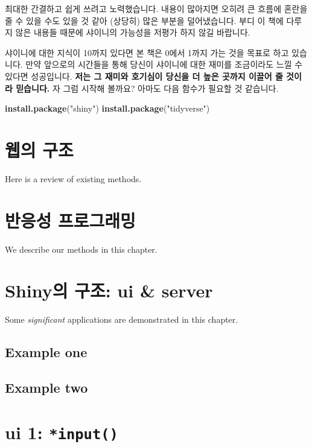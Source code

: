\documentclass[]{book}
\newenvironment{Shaded}{\begin{snugshade}}{\end{snugshade}}
\newcommand{\KeywordTok}[1]{\textcolor[rgb]{0.13,0.29,0.53}{\textbf{#1}}}
\newcommand{\StringTok}[1]{\textcolor[rgb]{0.31,0.60,0.02}{#1}}
\newcommand{\NormalTok}[1]{#1}
\begin{document}
최대한 간결하고 쉽게 쓰려고 노력했습니다. 내용이 많아지면 오히려 큰
흐름에 혼란을 줄 수 있을 수도 있을 것 같아 (상당히) 많은 부분을
덜어냈습니다. 부디 이 책에 다루지 않은 내용들 때문에 샤이니의 가능성을
저평가 하지 않길 바랍니다.

샤이니에 대한 지식이 10까지 있다면 본 책은 0에서 1까지 가는 것을 목표로
하고 있습니다. 만약 앞으로의 시간들을 통해 당신이 샤이니에 대한 재미를
조금이라도 느낄 수 있다면 성공입니다. \textbf{저는 그 재미와 호기심이
당신을 더 높은 곳까지 이끌어 줄 것이라 믿습니다.} 자 그럼 시작해 볼까요?
아마도 다음 함수가 필요할 것 같습니다.

\begin{Shaded}
\begin{Highlighting}[]
\KeywordTok{install.package}\NormalTok{(}\StringTok{"shiny"}\NormalTok{)}
\KeywordTok{install.package}\NormalTok{(}\StringTok{"tidyverse"}\NormalTok{)}
\end{Highlighting}
\end{Shaded}

\chapter{웹의 구조}\label{web}

Here is a review of existing methods.

\chapter{반응성 프로그래밍}\label{reactive}

We describe our methods in this chapter.

\chapter{Shiny의 구조: ui \& server}\label{structure}

Some \emph{significant} applications are demonstrated in this chapter.

\section{Example one}\label{example-one}

\section{Example two}\label{example-two}

\chapter{\texorpdfstring{ui 1:
\texttt{*input()}}{ui 1: *input()}}\label{ui1}
\end{document}
